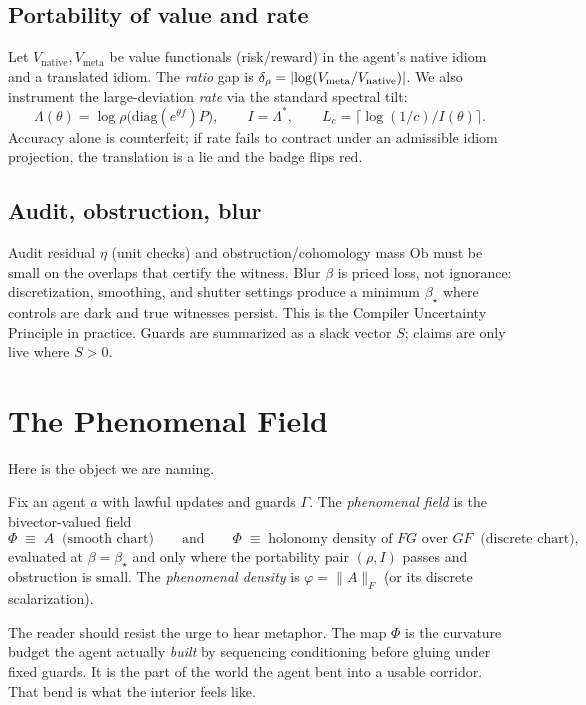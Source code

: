 \documentclass[11pt]{article}
\newcommand{\1}{\mathbf{1}}
\newcommand{\Lc}{L_c}
\newcommand{\diag}{\mathrm{diag}}
\newcommand{\Aanti}{A}  %
\newcommand{\Guard}{\Gamma}
\newcommand{\ratio}{\rho}
\newcommand{\rate}{I}
\newcommand{\Slack}{S}
\newcommand{\Blur}{\beta}
\begin{document}
\subsection*{Portability of value and rate}
Let $V_{\text{native}},V_{\text{meta}}$ be value functionals (risk/reward) in the agent's native idiom and a translated idiom. The \emph{ratio} gap is $\delta_{\ratio}=\abs{\log(V_{\text{meta}}/V_{\text{native}})}$. We also instrument the large-deviation \emph{rate} via the standard spectral tilt:
\[
\Lambda(\theta)=\log \rho\!\big(\diag(e^{\theta f})P\big),\qquad \rate=\Lambda^\ast,\qquad \Lc=\big\lceil\log(1/c)/\rate(\theta)\big\rceil.
\]
Accuracy alone is counterfeit; if rate fails to contract under an admissible idiom projection, the translation is a lie and the badge flips red.

\subsection*{Audit, obstruction, blur}
Audit residual $\eta$ (unit checks) and obstruction/cohomology mass $\mathrm{Ob}$ must be small on the overlaps that certify the witness. Blur $\Blur$ is priced loss, not ignorance: discretization, smoothing, and shutter settings produce a minimum $\Blur_\star$ where controls are dark and true witnesses persist. This is the Compiler Uncertainty Principle in practice. Guards are summarized as a slack vector $\Slack$; claims are only live where $\Slack>0$.

\section{The Phenomenal Field}
Here is the object we are naming.

\begin{defn}
Fix an agent $a$ with lawful updates and guards $\Guard$. The \emph{phenomenal field} is the bivector-valued field
\[
\Phi \;\equiv\; \Aanti\;\; \text{(smooth chart)} \qquad\text{and}\qquad
\Phi \;\equiv\; \text{holonomy density of $FG$ over $GF$}\;\; \text{(discrete chart)},
\]
evaluated at $\Blur=\Blur_\star$ and only where the portability pair $(\ratio,\rate)$ passes and obstruction is small. The \emph{phenomenal density} is $\varphi=\|\Aanti\|_F$ (or its discrete scalarization).
\end{defn}

\noindent The reader should resist the urge to hear metaphor. The map $\Phi$ is the curvature budget the agent actually \emph{built} by sequencing conditioning before gluing under fixed guards. It is the part of the world the agent bent into a usable corridor. That bend is what the interior feels like.
\end{document}

